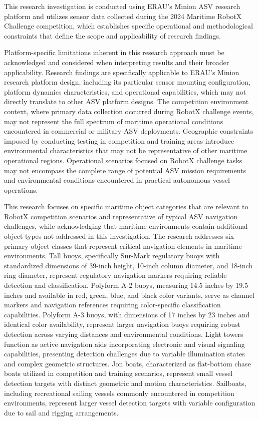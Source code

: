 \documentclass{erauthesis}
\begin{document}
This research investigation is conducted using \ac{ERAU}'s Minion \ac{ASV} research platform and utilizes sensor data collected during the 2024 Maritime RobotX Challenge competition, which establishes specific operational and methodological constraints that define the scope and applicability of research findings.

Platform-specific limitations inherent in this research approach must be acknowledged and considered when interpreting results and their broader applicability. Research findings are specifically applicable to \ac{ERAU}'s Minion research platform design, including its particular sensor mounting configuration, platform dynamics characteristics, and operational capabilities, which may not directly translate to other \ac{ASV} platform designs. The competition environment context, where primary data collection occurred during RobotX challenge events, may not represent the full spectrum of maritime operational conditions encountered in commercial or military \ac{ASV} deployments. Geographic constraints imposed by conducting testing in competition and training areas introduce environmental characteristics that may not be representative of other maritime operational regions. Operational scenarios focused on RobotX challenge tasks may not encompass the complete range of potential \ac{ASV} mission requirements and environmental conditions encountered in practical autonomous vessel operations.

This research focuses on specific maritime object categories that are relevant to RobotX competition scenarios and representative of typical \ac{ASV} navigation challenges, while acknowledging that maritime environments contain additional object types not addressed in this investigation. The research addresses six primary object classes that represent critical navigation elements in maritime environments. Tall buoys, specifically Sur-Mark regulatory buoys with standardized dimensions of 39-inch height, 10-inch column diameter, and 18-inch ring diameter, represent regulatory navigation markers requiring reliable detection and classification. Polyform A-2 buoys, measuring 14.5 inches by 19.5 inches and available in red, green, blue, and black color variants, serve as channel markers and navigation references requiring color-specific classification capabilities. Polyform A-3 buoys, with dimensions of 17 inches by 23 inches and identical color availability, represent larger navigation buoys requiring robust detection across varying distances and environmental conditions. Light towers function as active navigation aids incorporating electronic and visual signaling capabilities, presenting detection challenges due to variable illumination states and complex geometric structures. Jon boats, characterized as flat-bottom chase boats utilized in competition and training scenarios, represent small vessel detection targets with distinct geometric and motion characteristics. Sailboats, including recreational sailing vessels commonly encountered in competition environments, represent larger vessel detection targets with variable configuration due to sail and rigging arrangements.
\end{document}
